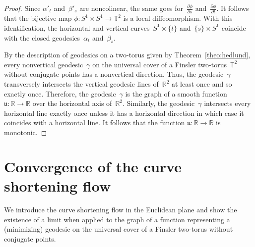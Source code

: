 \documentclass[AHL,Unicode,longabstracts,published]{cedram}
\newcommand{\R}{\mathbb{R}}
\newcommand{\T}{\mathbb{T}}
\newcommand{\bu}{\mathfrak{u}}
\begin{document}
\begin{proof}
Since $\alpha'_t$ and~$\beta'_s$ are noncolinear, the same goes for~$\frac{\partial \phi}{\partial s}$ and~$\frac{\partial \phi}{\partial t}$. It follows that the bijective map $\phi:S^1 \times S^1 \to \T^2$ is a local diffeomorphism. With this identification, the horizontal and vertical curves~$S^1 \times \{t\}$ and~$\{s\} \times S^1$ coincide with the closed geodesics~$\alpha_t$ and~$\beta_s$.

By the description of geodesics on a two-torus given by Theorem~\ref{theo:hedlund}, every nonvertical geodesic~$\gamma$ on the universal cover of a Finsler two-torus~$\T^2$ without conjugate points has a nonvertical direction. Thus, the geodesic~$\gamma$ transversely intersects the vertical geodesic lines of~$\R^2$ at least once and so exactly once. Therefore, the geodesic~$\gamma$ is the graph of a smooth function $\bu:\R \to \R$ over the horizontal axis of~$\R^2$. Similarly, the geodesic~$\gamma$ intersects every horizontal line exactly once unless it has a horizontal direction in which case it coincides with a horizontal line. It follows that the function $\bu:\R \to \R$ is monotonic.
\end{proof}



\section{Convergence of the curve shortening flow} \label{sec:convergenceCSF}

We introduce the curve shortening flow in the Euclidean plane and show the existence of a limit when applied to the graph of a function representing a (minimizing) geodesic on the universal cover of a Finsler two-torus without conjugate points.
\end{document}
